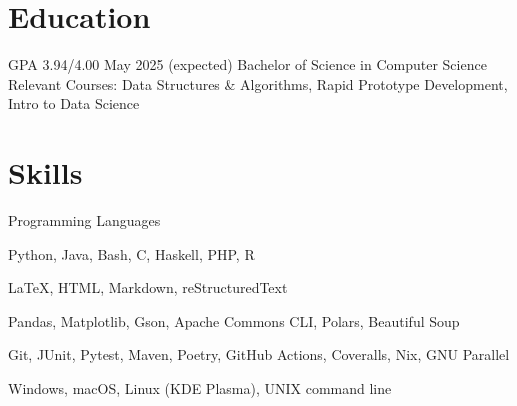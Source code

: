 \section{Education}
\begin{doutline}
     GPA 3.94/4.00
    \hfill May 2025 (expected)
        \2 Bachelor of Science in Computer Science
        \2 Relevant Courses: Data Structures \& Algorithms, Rapid Prototype Development, Intro to Data Science
\end{doutline}

\section{Skills}
\begin{labeling}{Programming Languages}
    \item [Programming Languages] Python, Java, Bash, C, Haskell, PHP, R
    \item [Markup Languages] \LaTeX, HTML, Markdown, reStructuredText
    \item [Libraries] Pandas, Matplotlib, Gson, Apache Commons CLI, Polars, Beautiful Soup
    \item [Tools] Git, JUnit, Pytest, Maven, Poetry, GitHub Actions, Coveralls, Nix, GNU Parallel
    \item [Operating Systems] Windows, macOS, Linux (KDE Plasma), UNIX command line
\end{labeling}

